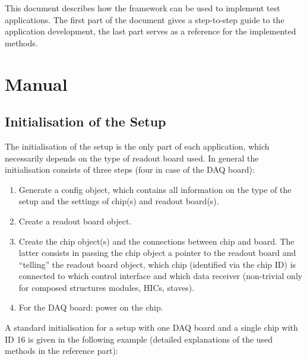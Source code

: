 \documentclass{article}
\begin{document}
This document describes how the framework can be used to implement
test applications. The first part of the
document gives a step-to-step guide to the application development,
the last part serves as a reference for the implemented methods. 

\section {Manual}

\subsection{Initialisation of the Setup}

The initialisation of the setup is the only part of each application,
which necessarily depends on the type of readout board used. In
general the initialisation consists of three steps (four in case of
the DAQ board):
\begin{enumerate}
\item Generate a config object, which contains all information on the
  type of the setup and the settings of chip(s) and readout board(s). 
\item Create a readout board object.
\item Create the chip object(s) and the connections between chip and
  board. The latter consists in passing the chip object a pointer to
  the readout board and ``telling'' the readout board object, which
  chip (identified via the chip ID) is connected to which control
  interface and which data receiver (non-trivial only for composed
  structures modules, HICs, staves). 
\item For the DAQ board: power on the chip.  
\end{enumerate}

A standard initialisation for a setup with one DAQ board and a single
chip with ID 16 is given in the following example (detailed
explanations of the used methods in the reference part): 
\end{document}

